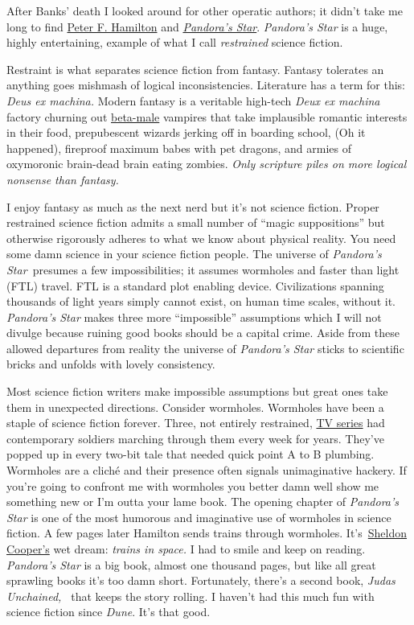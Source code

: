 After Banks' death I looked around for other operatic authors; it didn't
take me long to find \href{http://www.peterfhamilton.co.uk/}{Peter F.
Hamilton} and
\href{http://www.barnesandnoble.com/w/pandoras-star-peter-f-hamilton/1100293432?ean=9780345479211}{\emph{Pandora's
Star}}. \emph{Pandora's Star} is a huge, highly entertaining, example of
what I call \emph{restrained} science fiction.

Restraint is what separates science fiction from fantasy. Fantasy
tolerates an anything goes mishmash of logical inconsistencies.
Literature has a term for this: \emph{Deus ex machina.} Modern fantasy is
a veritable high-tech \emph{Deux ex machina} factory churning out
\href{http://theredpillroom.blogspot.com/p/masculexicon.html}{beta-male}
vampires that take implausible romantic interests in their food,
prepubescent wizards jerking off in boarding school, (Oh it happened),
fireproof maximum babes with pet dragons, and armies of oxymoronic
brain-dead brain eating zombies. \emph{Only scripture piles on more
logical nonsense than fantasy.}

I enjoy fantasy as much as the next nerd but it's not science fiction.
Proper restrained science fiction admits a small number of ``magic
suppositions'' but otherwise rigorously adheres to what we know about
physical reality. You need some damn science in your science fiction
people. The universe of \emph{Pandora's Star~}presumes a few
impossibilities; it assumes wormholes and faster than light (FTL)
travel. FTL is a standard plot enabling device. Civilizations spanning
thousands of light years simply cannot exist, on human time scales,
without it. \emph{Pandora's Star} makes three more ``impossible''
assumptions which I will not divulge because ruining good books should
be a capital crime. Aside from these allowed departures from reality the
universe of \emph{Pandora's Star} sticks to scientific bricks and unfolds
with lovely consistency.

Most science fiction writers make impossible assumptions but great ones
take them in unexpected directions. Consider wormholes. Wormholes have
been a staple of science fiction forever. Three, not entirely
restrained, \href{http://stargate.mgm.com/}{TV series} had contemporary
soldiers marching through them every week for years. They've popped up
in every two-bit tale that needed quick point A to B plumbing. Wormholes
are a cliché and their presence often signals unimaginative hackery. If
you're going to confront me with wormholes you better damn well show me
something new or I'm outta your lame book. The opening chapter of
\emph{Pandora's Star} is one of the most humorous and imaginative use of
wormholes in science fiction. A few pages later Hamilton sends trains
through wormholes.
It's~\href{http://www.cbs.com/shows/big\_bang\_theory/}{Sheldon
Cooper's} wet dream: \emph{trains in space.} I had to smile and keep on
reading. \emph{Pandora's Star} is a big book, almost one thousand pages,
but like all great sprawling books it's too damn short. Fortunately,
there's a second book, \emph{Judas Unchained,~} that keeps the story
rolling. I haven't had this much fun with science fiction since
\emph{Dune}. It's that good.

